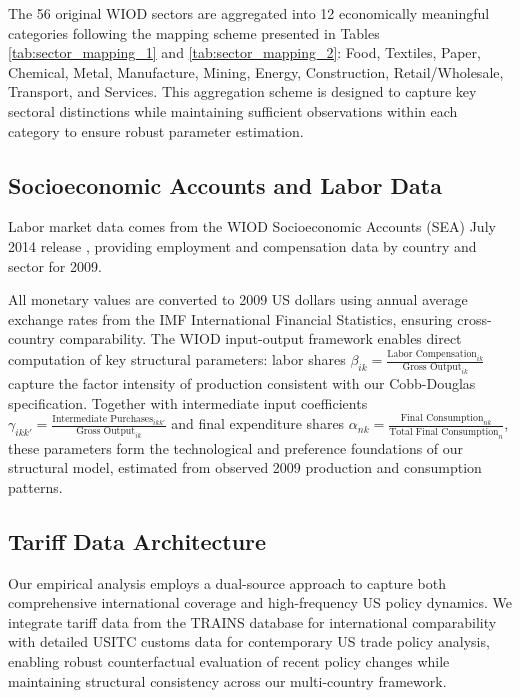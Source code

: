 The 56 original WIOD sectors are aggregated into 12 economically meaningful categories following the mapping scheme presented in Tables \ref{tab:sector_mapping_1} and \ref{tab:sector_mapping_2}: Food, Textiles, Paper, Chemical, Metal, Manufacture, Mining, Energy, Construction, Retail/Wholesale, Transport, and Services. This aggregation scheme is designed to capture key sectoral distinctions while maintaining sufficient observations within each category to ensure robust parameter estimation.





\subsection{Socioeconomic Accounts and Labor Data}

Labor market data comes from the WIOD Socioeconomic Accounts (SEA) July 2014 release \citep{timmer2015illustrated}, providing employment and compensation data by country and sector for 2009. 

All monetary values are converted to 2009 US dollars using annual average exchange rates from the IMF International Financial Statistics, ensuring cross-country comparability. The WIOD input-output framework enables direct computation of key structural parameters: labor shares $\beta_{ik} = \frac{\text{Labor Compensation}_{ik}}{\text{Gross Output}_{ik}}$ capture the factor intensity of production consistent with our Cobb-Douglas specification. Together with intermediate input coefficients $\gamma_{ikk'} = \frac{\text{Intermediate Purchases}_{ikk'}}{\text{Gross Output}_{ik}}$ and final expenditure shares $\alpha_{nk} = \frac{\text{Final Consumption}_{nk}}{\text{Total Final Consumption}_{n}}$, these parameters form the technological and preference foundations of our structural model, estimated from observed 2009 production and consumption patterns.

\subsection{Tariff Data Architecture}

Our empirical analysis employs a dual-source approach to capture both comprehensive international coverage and high-frequency US policy dynamics. We integrate tariff data from the TRAINS database for international comparability with detailed USITC customs data for contemporary US trade policy analysis, enabling robust counterfactual evaluation of recent policy changes while maintaining structural consistency across our multi-country framework.

